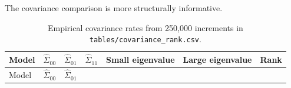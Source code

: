 \documentclass[
  english,
  10pt,
  letterpaper,
  DIV=11,
  numbers=noendperiod]{scrartcl}
\begin{document}
The covariance comparison is more structurally informative.

\begin{longtable}[]{@{}
  >{\raggedright\arraybackslash}p{}
  >{\raggedleft\arraybackslash}p{}
  >{\raggedleft\arraybackslash}p{}
  >{\raggedleft\arraybackslash}p{}
  >{\raggedleft\arraybackslash}p{}
  >{\raggedleft\arraybackslash}p{}
  >{\raggedleft\arraybackslash}p{}@{}}
\caption{Empirical covariance rates from 250,000 increments in
\protect\texttt{tables/covariance\_rank.csv}.}\label{tbl-covariance}\tabularnewline
\toprule\noalign{}
\begin{minipage}[b]{\linewidth}\raggedright
Model
\end{minipage} & \begin{minipage}[b]{\linewidth}\raggedleft
\(\widehat\Sigma_{00}\)
\end{minipage} & \begin{minipage}[b]{\linewidth}\raggedleft
\(\widehat\Sigma_{01}\)
\end{minipage} & \begin{minipage}[b]{\linewidth}\raggedleft
\(\widehat\Sigma_{11}\)
\end{minipage} & \begin{minipage}[b]{\linewidth}\raggedleft
Small eigenvalue
\end{minipage} & \begin{minipage}[b]{\linewidth}\raggedleft
Large eigenvalue
\end{minipage} & \begin{minipage}[b]{\linewidth}\raggedleft
Rank
\end{minipage} \\
\midrule\noalign{}
\endfirsthead
\toprule\noalign{}
\begin{minipage}[b]{\linewidth}\raggedright
Model
\end{minipage} & \begin{minipage}[b]{\linewidth}\raggedleft
\(\widehat\Sigma_{00}\)
\end{minipage} & \begin{minipage}[b]{\linewidth}\raggedleft
\(\widehat\Sigma_{01}\)
\end{minipage} & \begin{minipage}[b]{\linewidth}\raggedleft

\end{minipage}
\end{longtable}
\end{document}
